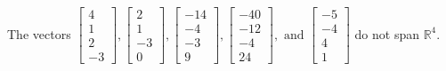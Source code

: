 \begin{exercise}
\begin{exerciseStatement}
  \end{exerciseStatement}
  \begin{exerciseAnswer}
   The vectors \(\left[\begin{array}{r}
4 \\
1 \\
2 \\
-3
\end{array}\right] , \left[\begin{array}{r}
2 \\
1 \\
-3 \\
0
\end{array}\right] , \left[\begin{array}{r}
-14 \\
-4 \\
-3 \\
9
\end{array}\right] , \left[\begin{array}{r}
-40 \\
-12 \\
-4 \\
24
\end{array}\right] , \text{ and } \left[\begin{array}{r}
-5 \\
-4 \\
4 \\
1
\end{array}\right]\) 
  	 do not  
	span \(\mathbb{R}^4\).
  


  \end{exerciseAnswer}
\end{exercise}